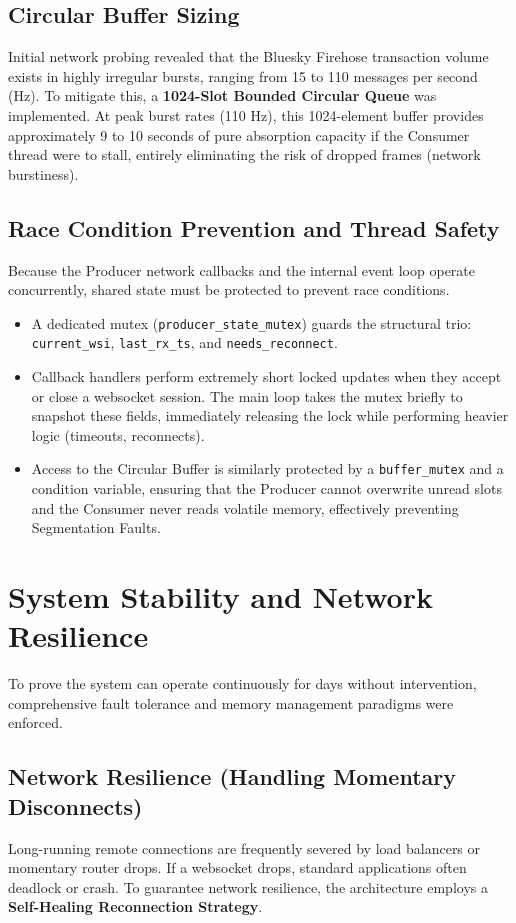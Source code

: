 \documentclass[12pt,a4paper]{article}
\begin{document}
\subsection{Circular Buffer Sizing}
Initial network probing revealed that the Bluesky Firehose transaction volume exists in highly irregular bursts, ranging from 15 to 110 messages per second (Hz). To mitigate this, a \textbf{1024-Slot Bounded Circular Queue} was implemented. At peak burst rates (110 Hz), this 1024-element buffer provides approximately 9 to 10 seconds of pure absorption capacity if the Consumer thread were to stall, entirely eliminating the risk of dropped frames (network burstiness).

\subsection{Race Condition Prevention and Thread Safety}
Because the Producer network callbacks and the internal event loop operate concurrently, shared state must be protected to prevent race conditions. 
\begin{itemize}[nosep]
    \item A dedicated mutex (\texttt{producer\_state\_mutex}) guards the structural trio: \texttt{current\_wsi}, \texttt{last\_rx\_ts}, and \texttt{needs\_reconnect}.
    \item Callback handlers perform extremely short locked updates when they accept or close a websocket session. The main loop takes the mutex briefly to snapshot these fields, immediately releasing the lock while performing heavier logic (timeouts, reconnects).
    \item Access to the Circular Buffer is similarly protected by a \texttt{buffer\_mutex} and a condition variable, ensuring that the Producer cannot overwrite unread slots and the Consumer never reads volatile memory, effectively preventing Segmentation Faults.
\end{itemize}

\section{System Stability and Network Resilience}
To prove the system can operate continuously for days without intervention, comprehensive fault tolerance and memory management paradigms were enforced.

\subsection{Network Resilience (Handling Momentary Disconnects)}
Long-running remote connections are frequently severed by load balancers or momentary router drops. If a websocket drops, standard applications often deadlock or crash. To guarantee network resilience, the architecture employs a \textbf{Self-Healing Reconnection Strategy}. 
\end{document}
